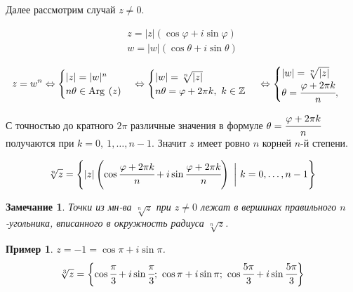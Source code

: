 \documentclass[a4paper,12pt]{article}
\newtheorem*{Examples}{Пример}
\newtheorem*{Comment}{Замечание}
\renewcommand{\Re}{\mathrm{Re\:}}
\renewcommand{\Im}{\mathrm{Im\:}}
\newcommand{\Arg}{\mathrm{Arg\:}}
\begin{document}
Далее рассмотрим случай $z \neq 0$. 

\begin{gather*}
z = |z|\left(\cos\varphi+i\sin\varphi\right)\\
w = |w|\left(\cos\theta+i\sin\theta\right)
\end{gather*}

\[
z = w^n \Leftrightarrow
\begin{cases}
|z| = |w|^n \\
n\theta\in\Arg\left(z\right)
\end{cases}
\Leftrightarrow
\begin{cases}
|w|= \sqrt[n]{|z|}\\
n\theta= \varphi+2\pi k,\ k\in \mathbb Z
\end{cases}\\
\Leftrightarrow
\begin{cases}
|w|=\sqrt[n]{|z|}\\
\theta = \cfrac{\varphi+2\pi k}{n},\
\end{cases}
\]

С точностью до кратного $2\pi$ различные значения в формуле $\theta = \cfrac{\varphi+2\pi k }{n}$ получаются при $k = 0,\ 1,\ldots,n-1$. Значит $z$ имеет ровно $n$ корней $n$-й степени. 

\[ \sqrt[n]{z} = \Biggl\{|z|\left(\cos\cfrac{\varphi+2\pi k}{n}+i\sin\cfrac{\varphi+2\pi k }{n}\right)\ \biggl|\ k=0,\ldots,n-1\Biggr\}
\]

\begin{Comment}
Точки из мн-ва $\sqrt[n]{z}$ при $z\neq 0$ лежат в вершинах правильного $n$-угольника, вписанного в окружность радиуса $\sqrt[n]{z}$. 
\end{Comment}

\begin{Examples}
$z=-1=\cos\pi+i\sin\pi$. 
\[
\sqrt[3]{z} = \biggl\{ \cos\cfrac\pi3+i\sin\cfrac\pi3;\ \cos\pi+i\sin\pi;\ \cos\cfrac{5\pi}{3}+i\sin\cfrac{5\pi}{3} \biggl\}
\]
\end{Examples}

\end{document}
